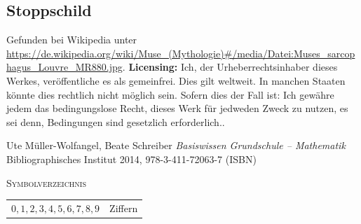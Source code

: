\documentclass[a4paper]{amsart}
\theoremstyle{definition}
\begin{document}
\subsection{Stoppschild}
Gefunden bei Wikipedia unter \url{https://de.wikipedia.org/wiki/Muse_(Mythologie)#/media/Datei:Muses_sarcophagus_Louvre_MR880.jpg}. \textbf{Licensing:} Ich, der Urheberrechtsinhaber dieses Werkes, veröffentliche es als gemeinfrei. Dies gilt weltweit. In manchen Staaten könnte dies rechtlich nicht möglich sein. Sofern dies der Fall ist: Ich gewähre jedem das bedingungslose Recht, dieses Werk für jedweden Zweck zu nutzen, es sei denn, Bedingungen sind gesetzlich erforderlich..


\begin{thebibliography}{9}
      Ute Müller-Wolfangel, Beate Schreiber \emph{Basiswissen Grundschule – Mathematik}
      Bibliographisches Institut 2014, 978-3-411-72063-7 (ISBN)
      
\end{thebibliography}

\begin{large}
    \centerline{\textsc{Symbolverzeichnis}}
\end{large}
\bigskip

\renewcommand*{\arraystretch}{1}

\begin{tabular}{ll}
    $0,1,2,3,4,5,6,7,8,9$          & Ziffern\\
\end{tabular}
\end{document}
